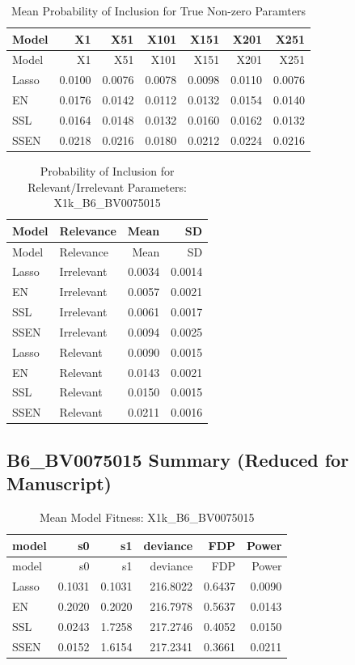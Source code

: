 \documentclass[
]{article}
\begin{document}
\begin{longtable}[]{@{}lrrrrrr@{}}
\caption{Mean Probability of Inclusion for True Non-zero
Paramters}\tabularnewline
\toprule
Model & X1 & X51 & X101 & X151 & X201 & X251 \\
\midrule
\endfirsthead
\toprule
Model & X1 & X51 & X101 & X151 & X201 & X251 \\
\midrule
\endhead
Lasso & 0.0100 & 0.0076 & 0.0078 & 0.0098 & 0.0110 & 0.0076 \\
EN & 0.0176 & 0.0142 & 0.0112 & 0.0132 & 0.0154 & 0.0140 \\
SSL & 0.0164 & 0.0148 & 0.0132 & 0.0160 & 0.0162 & 0.0132 \\
SSEN & 0.0218 & 0.0216 & 0.0180 & 0.0212 & 0.0224 & 0.0216 \\
\bottomrule
\end{longtable}

\begin{longtable}[]{@{}llrr@{}}
\caption{Probability of Inclusion for Relevant/Irrelevant Parameters:
X1k\_B6\_BV0075015}\tabularnewline
\toprule
Model & Relevance & Mean & SD \\
\midrule
\endfirsthead
\toprule
Model & Relevance & Mean & SD \\
\midrule
\endhead
Lasso & Irrelevant & 0.0034 & 0.0014 \\
EN & Irrelevant & 0.0057 & 0.0021 \\
SSL & Irrelevant & 0.0061 & 0.0017 \\
SSEN & Irrelevant & 0.0094 & 0.0025 \\
Lasso & Relevant & 0.0090 & 0.0015 \\
EN & Relevant & 0.0143 & 0.0021 \\
SSL & Relevant & 0.0150 & 0.0015 \\
SSEN & Relevant & 0.0211 & 0.0016 \\
\bottomrule
\end{longtable}

\hypertarget{b6_bv0075015-summary-reduced-for-manuscript}{%
\subsection{B6\_BV0075015 Summary (Reduced for
Manuscript)}\label{b6_bv0075015-summary-reduced-for-manuscript}}

\begin{longtable}[]{@{}lrrrrr@{}}
\caption{Mean Model Fitness: X1k\_B6\_BV0075015}\tabularnewline
\toprule
model & s0 & s1 & deviance & FDP & Power \\
\midrule
\endfirsthead
\toprule
model & s0 & s1 & deviance & FDP & Power \\
\midrule
\endhead
Lasso & 0.1031 & 0.1031 & 216.8022 & 0.6437 & 0.0090 \\
EN & 0.2020 & 0.2020 & 216.7978 & 0.5637 & 0.0143 \\
SSL & 0.0243 & 1.7258 & 217.2746 & 0.4052 & 0.0150 \\
SSEN & 0.0152 & 1.6154 & 217.2341 & 0.3661 & 0.0211 \\
\bottomrule
\end{longtable}
\end{document}
